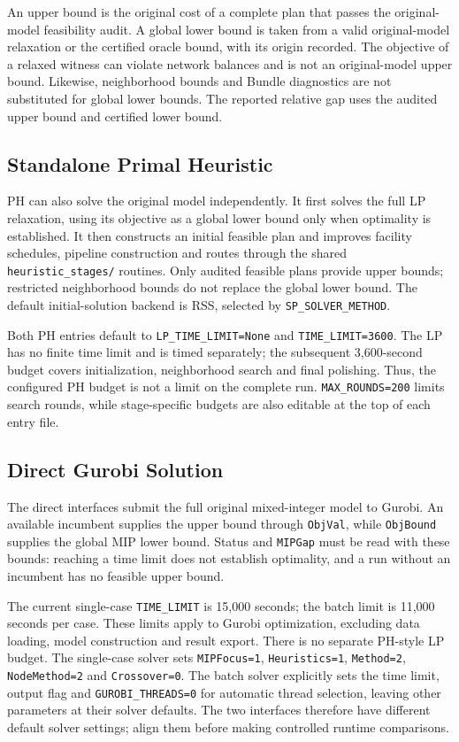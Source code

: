 \documentclass[11pt,letterpaper]{article}
\newcommand{\file}[1]{\texttt{\small\nolinkurl{#1}}}
\begin{document}
An upper bound is the original cost of a complete plan that passes the original-model feasibility audit. A global lower bound is taken from a valid original-model relaxation or the certified oracle bound, with its origin recorded. The objective of a relaxed witness can violate network balances and is not an original-model upper bound. Likewise, neighborhood bounds and Bundle diagnostics are not substituted for global lower bounds. The reported relative gap uses the audited upper bound and certified lower bound.

\subsection{Standalone Primal Heuristic}

PH can also solve the original model independently. It first solves the full LP relaxation, using its objective as a global lower bound only when optimality is established. It then constructs an initial feasible plan and improves facility schedules, pipeline construction and routes through the shared \file{heuristic_stages/} routines. Only audited feasible plans provide upper bounds; restricted neighborhood bounds do not replace the global lower bound. The default initial-solution backend is RSS, selected by \file{SP_SOLVER_METHOD}.

Both PH entries default to \file{LP_TIME_LIMIT=None} and \file{TIME_LIMIT=3600}. The LP has no finite time limit and is timed separately; the subsequent 3,600-second budget covers initialization, neighborhood search and final polishing. Thus, the configured PH budget is not a limit on the complete run. \file{MAX_ROUNDS=200} limits search rounds, while stage-specific budgets are also editable at the top of each entry file.

\subsection{Direct Gurobi Solution}

The direct interfaces submit the full original mixed-integer model to Gurobi. An available incumbent supplies the upper bound through \file{ObjVal}, while \file{ObjBound} supplies the global MIP lower bound. Status and \file{MIPGap} must be read with these bounds: reaching a time limit does not establish optimality, and a run without an incumbent has no feasible upper bound.

The current single-case \file{TIME_LIMIT} is 15,000 seconds; the batch limit is 11,000 seconds per case. These limits apply to Gurobi optimization, excluding data loading, model construction and result export. There is no separate PH-style LP budget. The single-case solver sets \file{MIPFocus=1}, \file{Heuristics=1}, \file{Method=2}, \file{NodeMethod=2} and \file{Crossover=0}. The batch solver explicitly sets the time limit, output flag and \file{GUROBI_THREADS=0} for automatic thread selection, leaving other parameters at their solver defaults. The two interfaces therefore have different default solver settings; align them before making controlled runtime comparisons.
\end{document}
